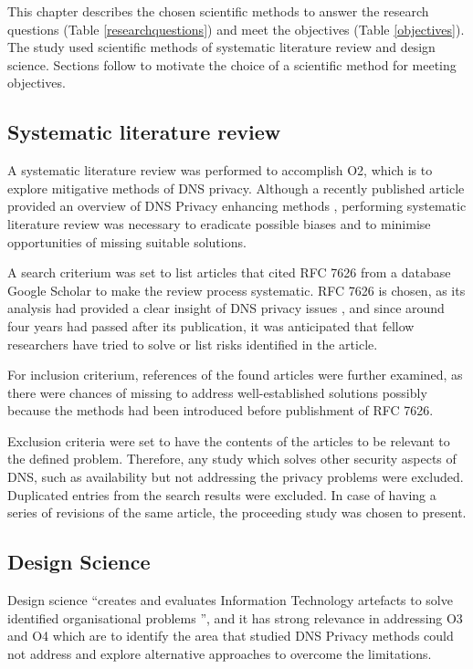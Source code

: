 
This chapter describes the chosen scientific methods to answer the research questions (Table \ref{researchquestions}) and meet the objectives (Table \ref{objectives}).
The study used scientific methods of systematic literature review and design science.
Sections follow to motivate the choice of a scientific method for meeting objectives.
\subsection{Systematic literature review}
A systematic literature review was performed to accomplish O2, which is to explore mitigative methods of DNS privacy. Although a recently published article provided an overview of DNS Privacy enhancing methods \cite{van2018privacy}, performing systematic literature review was necessary to eradicate possible biases and to minimise opportunities of missing suitable solutions.

A search criterium was set to list articles that cited RFC 7626 from a database Google Scholar to make the review process systematic. RFC 7626 is chosen, as its analysis had provided a clear insight of DNS privacy issues \cite{rfc7626}, and since around four years had passed after its publication, it was anticipated that fellow researchers have tried to solve or list risks identified in the article.

For inclusion criterium, references of the found articles were further examined, as there were chances of missing to address well-established solutions possibly because the methods had been introduced before publishment of RFC 7626.

Exclusion criteria were set to have the contents of the articles to be relevant to the defined problem.
Therefore, any study which solves other security aspects of DNS, such as availability but not addressing the privacy problems were excluded.
Duplicated entries from the search results were excluded.
In case of having a series of revisions of the same article, the proceeding study was chosen to present.

\subsection{Design Science}
Design science ``creates and evaluates Information Technology artefacts to solve identified organisational problems \cite{von2004design}'', and it has strong relevance in addressing O3 and O4 which are to identify the area that studied DNS Privacy methods could not address and explore alternative approaches to overcome the limitations.

